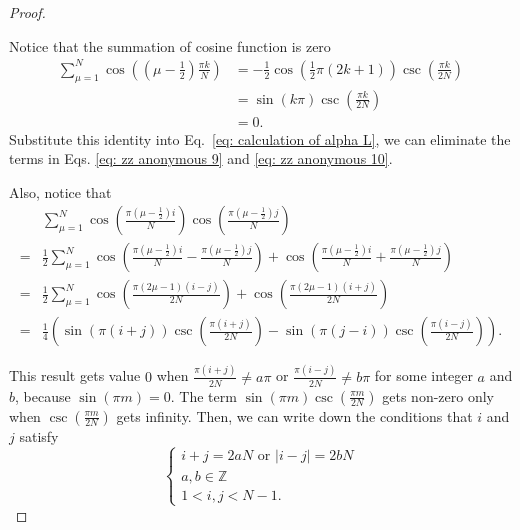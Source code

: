 \documentclass[showpacs,twocolumn,aps,prx,long bibliography,superscriptaddress,notitlepage]{revtex4-1}
\begin{document}
\begin{proof}
\begin{widetext}
Notice that the summation of cosine function is zero 
\begin{equation}
\begin{aligned}
\sum_{\mu=1}^{N} \cos\left(\left(\mu-\frac{1}{2}\right) \frac{\pi k}{N}\right)& =-\frac{1}{2} \cos \left(\frac{1}{2} \pi(2 k+1)\right) \csc \left(\frac{\pi k}{2 N}\right) \\
& =\sin (k \pi) \csc \left(\frac{\pi k}{2 N}\right) \\
& =0.
\end{aligned}
\end{equation}
Substitute this identity into Eq.~\eqref{eq: calculation of alpha L}, we can eliminate the terms in Eqs. \eqref{eq: zz anonymous 9} and \eqref{eq: zz anonymous 10}. 

Also, notice that
\begin{equation}
\label{eq: zz anonymous 12}
\begin{aligned}
& \sum_{\mu=1}^{N} \cos \left(\frac{\pi\left(\mu-\frac{1}{2}\right) i}{N}\right) \cos \left(\frac{\pi\left(\mu-\frac{1}{2}\right) j}{N}\right) \\
= & \frac{1}{2} \sum_{\mu=1}^{N} \cos \left(\frac{\pi\left(\mu-\frac{1}{2}\right) i}{N}-\frac{\pi\left(\mu-\frac{1}{2}\right) j}{N}\right)+\cos \left(\frac{\pi\left(\mu-\frac{1}{2}\right) i}{N}+\frac{\pi\left(\mu-\frac{1}{2}\right) j}{N}\right) \\
= & \frac{1}{2} \sum_{\mu=1}^{N} \cos \left(\frac{\pi(2 \mu-1)(i-j)}{2 N}\right)+\cos \left(\frac{\pi(2 \mu-1)(i+j)}{2 N}\right) \\
= & \frac{1}{4}\left(\sin (\pi(i+j)) \csc \left(\frac{\pi(i+j)}{2 N}\right)-\sin (\pi(j-i)) \csc \left(\frac{\pi(i-j)}{2 N}\right)\right).
\end{aligned}
\end{equation}
\end{widetext}
This result gets value $0$ when $\frac{\pi(i+j)}{2 N}\neq a \pi$ or $\frac{\pi(i-j)}{2 N}\neq b \pi$ for some integer $a$ and $b$, because $\sin(\pi m) = 0$. The term $ \sin(\pi m) \csc(\frac{\pi m}{2N})$ gets non-zero only when $\csc(\frac{\pi m}{2N})$ gets infinity. Then, we can write down the conditions that $i$ and $j$ satisfy
\begin{equation}
\left\{\begin{array}{l}
i+j=2 a N \text { or } |i-j|=2 b N \\
a, b \in \mathbb{Z} \\
1<i,j<N-1.
\end{array} \right.
\end{equation}

\end{proof}
\end{document}
